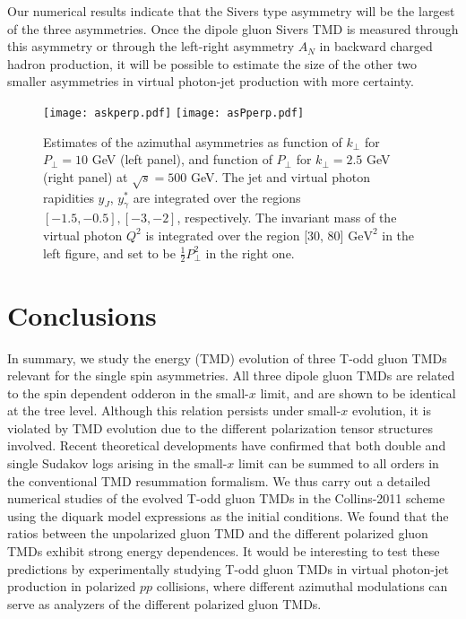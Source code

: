 \documentclass[prd,aps,preprintnumbers,fleqn,showpacs,nofootinbib,superscriptaddress]{revtex4}
\begin{document}
Our numerical results indicate that the Sivers type asymmetry will be the largest of the three asymmetries. Once the dipole gluon Sivers TMD is measured through this asymmetry or through the left-right asymmetry $A_N$ in backward charged hadron production, it will be possible to estimate the size of the other two smaller asymmetries in virtual photon-jet production with more certainty.

\begin{figure}[h]
\texttt{[image: askperp.pdf]}
\texttt{[image: asPperp.pdf]}
\caption{Estimates of the azimuthal asymmetries as function of $k_\perp$ for $P_\perp=10$ GeV (left panel), and function of $P_\perp$ for $k_\perp=2.5$ GeV (right panel) at $\sqrt s=500$ GeV. The jet and virtual photon rapidities 
$y_J$, $y_\gamma^*$ are integrated over the regions $[-1.5,-0.5], [-3,-2]$, respectively. The invariant mass of the virtual photon $Q^2$ is integrated over the region [30, 80] $\text{GeV}^2$ in the left figure, and set to be $\frac{1}{2} P_{\perp}^2$ in the right one.} 
\label{figs:azimuthal_asymmetry}
\end{figure}


\section{Conclusions}
 In summary, we study the energy (TMD) evolution of three T-odd gluon TMDs relevant for the single spin asymmetries.  All  three dipole gluon TMDs are related to the spin dependent odderon in the small-$x$ limit, and are shown to be identical at the tree level. Although this relation persists under small-$x$ evolution, it is violated by TMD  evolution due to the different polarization tensor structures involved. Recent theoretical developments have confirmed that both double and single Sudakov logs arising in the small-$x$ limit can be summed to all orders in the conventional TMD resummation formalism. We thus carry out a detailed numerical studies of the evolved T-odd gluon TMDs in the Collins-2011 scheme using the diquark model expressions as the initial conditions.  We found that the ratios between the unpolarized gluon TMD and the different polarized gluon TMDs exhibit strong energy  dependences.  It would be interesting to test these predictions by experimentally studying T-odd gluon TMDs in virtual photon-jet production in polarized $pp$ collisions, where different azimuthal modulations can serve as analyzers of the different polarized gluon TMDs. 
 
\end{document}
